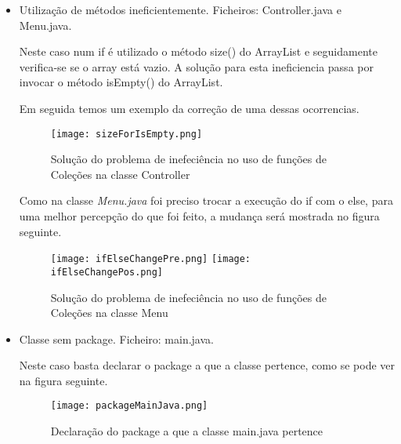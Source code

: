 \begin{itemize}
\item Utilização de métodos ineficientemente.\newline
 Ficheiros: Controller.java e Menu.java.\newline


\par Neste caso num if é utilizado o método size() do ArrayList e seguidamente verifica-se se o array está vazio. A solução para esta ineficiencia passa por invocar o método isEmpty() do ArrayList.\newline
\par Em seguida temos um exemplo da correção de uma dessas ocorrencias. 
\begin{figure}[H]

  \centering

  \texttt{[image: sizeForIsEmpty.png]}

  \caption {Solução do problema de inefeciência no uso de funções de Coleções na classe Controller}

  \label {fig17}

\end{figure}


\par Como na classe \textit{Menu.java} foi preciso trocar a execução do if com o else, para uma melhor percepção do que foi feito, a mudança será mostrada no figura seguinte.

\begin{figure}[H]

  \centering

  \texttt{[image: ifElseChangePre.png]}
  \texttt{[image: ifElseChangePos.png]}

  \caption {Solução do problema de inefeciência no uso de funções de Coleções na classe Menu}

  \label {fig18}

\end{figure}

\end{itemize}

\begin{itemize}
\item Classe sem package.\newline
 Ficheiro: main.java.\newline


\par Neste caso basta declarar o package a que a classe pertence, como se pode ver na figura seguinte.\newline 

\begin{figure}[H]

  \centering

  \texttt{[image: packageMainJava.png]}

  \caption {Declaração do package a que a classe main.java pertence}

  \label {fig19}

\end{figure}

\end{itemize}


